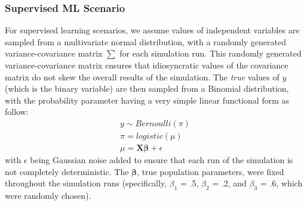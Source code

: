 \documentclass[man, 12pt, a4paper, nolmodern, noextraspace]{apa6}
\begin{document}
    \subsubsection{Supervised ML Scenario}
    For supervised learning scenarios, we assume values of independent variables are sampled from a multivariate normal distribution, with a randomly generated variance-covariance matrix \textbf{$\sum$} for each simulation run. This randomly generated variance-covariance matrix ensures that idiosyncratic values of the covariance matrix do not skew the overall results of the simulation. The \textit{true}  values of $y$ (which is the binary variable) are then sampled from a Binomial distribution, with the probability parameter having a very simple linear functional form as follow:
    \begin{equation}
        \begin{gathered}
            y \sim Bernoulli(\pi) \\
            \pi = logistic(\mu) \\
            \mu = \boldsymbol{X\beta} + \epsilon
        \end{gathered}
    \end{equation}
    \noindent with $\epsilon$ being Gaussian noise added to ensure that each run of the simulation is not completely deterministic. The $\boldsymbol{\beta}$, true population parameters, were fixed throughout the simulation runs (specifically, $\beta_1$ = .5, $\beta_2$ = .2, and $\beta_3$ = .6, which were randomly chosen). 
    
\end{document}
